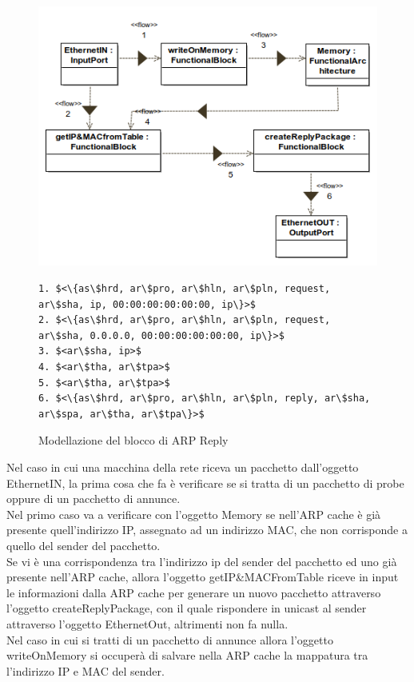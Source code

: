 \begin{figure}[h!] 
    \centering 
    \includegraphics[scale=0.6]{img/ARP/ARP_Reply_Object_diagram.png} 
\begin{lstlisting}[frame=single, mathescape, basicstyle=\footnotesize]
1. $<\{as\$hrd, ar\$pro, ar\$hln, ar\$pln, request, ar\$sha, ip, 00:00:00:00:00:00, ip\}>$
2. $<\{as\$hrd, ar\$pro, ar\$hln, ar\$pln, request, ar\$sha, 0.0.0.0, 00:00:00:00:00:00, ip\}>$
3. $<ar\$sha, ip>$
4. $<ar\$tha, ar\$tpa>$
5. $<ar\$tha, ar\$tpa>$
6. $<\{as\$hrd, ar\$pro, ar\$hln, ar\$pln, reply, ar\$sha, ar\$spa, ar\$tha, ar\$tpa\}>$
\end{lstlisting}
    \caption{Modellazione del blocco di ARP Reply} 
\end{figure}
\noindent Nel caso in cui una macchina della rete riceva un pacchetto dall'oggetto EthernetIN, la prima cosa che fa è verificare se si tratta di un pacchetto di probe oppure di un pacchetto di annunce.\\
Nel primo caso va a verificare con l'oggetto Memory se nell'ARP cache è già presente quell'indirizzo IP, assegnato ad un indirizzo MAC, che non corrisponde a quello del sender del pacchetto.\\ 
Se vi è una corrispondenza tra l'indirizzo ip del sender del pacchetto ed uno già presente nell'ARP cache, allora l'oggetto getIP\&MACFromTable riceve in input le informazioni dalla ARP cache per generare un nuovo pacchetto attraverso l'oggetto createReplyPackage, con il quale rispondere in unicast al sender attraverso l'oggetto EthernetOut, altrimenti non fa nulla.\\
Nel caso in cui si tratti di un pacchetto di annunce allora l'oggetto writeOnMemory si occuperà di salvare nella ARP cache la mappatura tra l'indirizzo IP e MAC del sender.\\
\newpage
\clearpage
